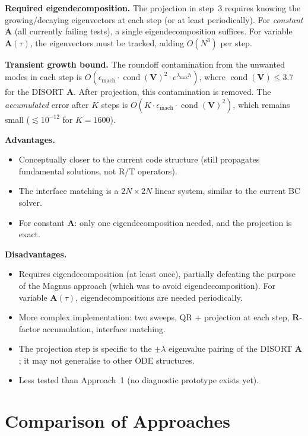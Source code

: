 \documentclass[11pt,a4paper]{article}
\newcommand{\cond}{\operatorname{cond}}
\newcommand{\mat}[1]{\mathbf{#1}}
\theoremstyle{definition}
\begin{document}
\textbf{Required eigendecomposition.}  The projection in step~3 requires
knowing the growing/decaying eigenvectors at each step (or at least
periodically).  For \emph{constant} $\mat{A}$ (all currently failing tests),
a single eigendecomposition suffices.  For variable $\mat{A}(\tau)$, the
eigenvectors must be tracked, adding $O(N^3)$ per step.

\textbf{Transient growth bound.}  The roundoff contamination from the
unwanted modes in each step is $O(\epsilon_{\text{mach}}\cdot\cond(\mat{V})^2
\cdot e^{\lambda_{\max}h})$, where $\cond(\mat{V})\leq 3.7$ for the DISORT
$\mat{A}$.  After projection, this contamination is removed.  The
\emph{accumulated} error after $K$ steps is
$O(K\cdot\epsilon_{\text{mach}}\cdot\cond(\mat{V})^2)$, which remains
small ($\lesssim 10^{-12}$ for $K=1600$).

\textbf{Advantages.}
\begin{itemize}[nosep]
\item Conceptually closer to the current code structure (still propagates
  fundamental solutions, not R/T operators).
\item The interface matching is a $2N\times 2N$ linear system, similar to
  the current BC solver.
\item For constant $\mat{A}$: only one eigendecomposition needed, and the
  projection is exact.
\end{itemize}

\textbf{Disadvantages.}
\begin{itemize}[nosep]
\item Requires eigendecomposition (at least once), partially defeating the
  purpose of the Magnus approach (which was to avoid eigendecomposition).
  For variable $\mat{A}(\tau)$, eigendecompositions are needed periodically.
\item More complex implementation: two sweeps, QR + projection at each step,
  $\mat{R}$-factor accumulation, interface matching.
\item The projection step is specific to the $\pm\lambda$ eigenvalue pairing
  of the DISORT $\mat{A}$; it may not generalise to other ODE structures.
\item Less tested than Approach~1 (no diagnostic prototype exists yet).
\end{itemize}


\section{Comparison of Approaches}\label{sec:comparison}
\end{document}
